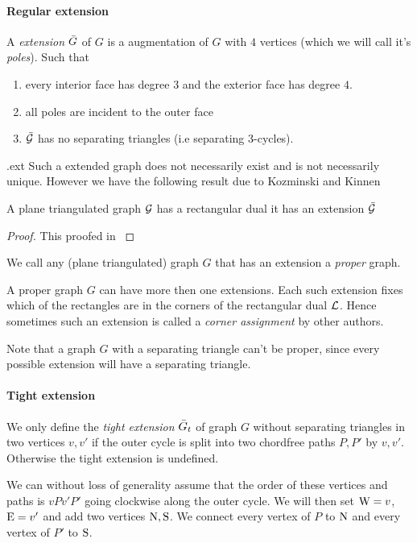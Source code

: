 \paragraph{Regular extension}
A \emph{extension} $\bar{G}$ of $G$ is a augmentation of $G$ with $4$ vertices (which we will call it's \emph{poles}). Such that
\begin{enumerate}
\item every interior face has degree $3$ and the exterior face has degree $4$.
\item all poles are incident to the outer face
\item $\bar{\mathcal{G}}$ has no separating triangles (i.e separating $3$-cycles).
\end{enumerate}.ext
Such a extended graph does not necessarily exist and is not necessarily unique.
However we have the following result due to Kozminski and Kinnen

\begin{thrm}
A plane triangulated graph $\mathcal{G}$ has a rectangular dual \ifftext it has an extension $\bar{\mathcal{G}}$
\end{thrm}

\begin{proof}
  This proofed in \cite{Kozminski1984} 
\end{proof}

We call any (plane triangulated) graph $G$ that has an extension a \emph{proper} graph.

A proper graph $G$ can have more then one extensions. Each such extension fixes which of the rectangles are in the corners of the rectangular dual $\mathcal{L}$. Hence sometimes such an extension is called a \emph{corner assignment} by other authors.

Note that a graph $G$ with a separating triangle can't be proper, since every possible extension will have a separating triangle.

\paragraph{Tight extension}
We only define the \emph{tight extension} $\bar{G}_t$ of graph $G$ without separating triangles in two vertices $v, v'$ if the outer cycle is split into two chordfree paths $P, P'$ by $v,v'$. Otherwise the tight extension is undefined.

We can without loss of generality assume that the order of these vertices and paths is $v P v' P'$ going clockwise along the outer cycle. We will then set $\mathrm{W} = v$, $\mathrm{E} =v'$ and add two vertices $\mathrm{N}, \mathrm{S}$. We connect every vertex of $P$ to $\mathrm{N}$ and every vertex of $P'$ to $\mathrm{S}$.

